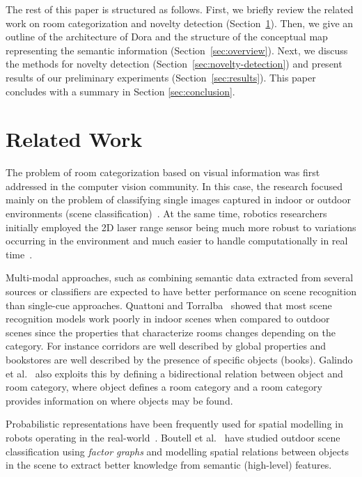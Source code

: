 \documentclass[runningheads,a4paper]{llncs}
\begin{document}
The rest of this paper is structured as follows. First, we briefly review the related work on
room categorization and novelty detection (Section~\ref{sec:related}). Then, we give an outline of the 
architecture of Dora and the structure of the conceptual map representing the semantic information
(Section~\ref{sec:overview}). Next, we discuss the methods for novelty detection (Section~\ref{sec:novelty-detection}) 
and present results of our preliminary experiments (Section~\ref{sec:results}). This paper concludes with a 
summary in Section \ref{sec:conclusion}.


\section{Related Work}
\label{sec:related}
The problem of room categorization based on visual information was first addressed
in the computer vision community. In this case, the research focused mainly on the
problem of classifying single images captured in indoor or outdoor environments
(scene classification)~\cite{oliva2006building,torralba2003contextual}.
At the same time, robotics researchers initially employed
the 2D laser range sensor being much more robust to variations occurring in the
environment and much easier to handle computationally in real time~\cite{mozos2005supervised}.

Multi-modal approaches, such as combining semantic data extracted from
several sources or classifiers are expected to have better performance on scene
recognition than single-cue approaches. Quattoni and Torralba~\cite{quattoni2009recognizing}
showed that most scene recognition models work poorly in indoor scenes when
compared to outdoor scenes since the properties that
characterize rooms changes depending on the category. For instance corridors are well
described by global properties and bookstores are well described by the presence of
specific objects (books).
Galindo et al.~\cite{galindo2005multi} also exploits this by defining a bidirectional relation
between object and room category, where object defines a room category and a room
category provides information on where objects may be found.

Probabilistic representations have been frequently used for spatial modelling
in robots operating in the real-world~\cite{gross2009toomas,maier2010probabilistic}.
Boutell et al.~\cite{boutell2006factor} have studied outdoor scene classification using
\emph{factor graphs} and modelling spatial relations between objects in the scene
to extract better knowledge from semantic (high-level) features.
\end{document}
